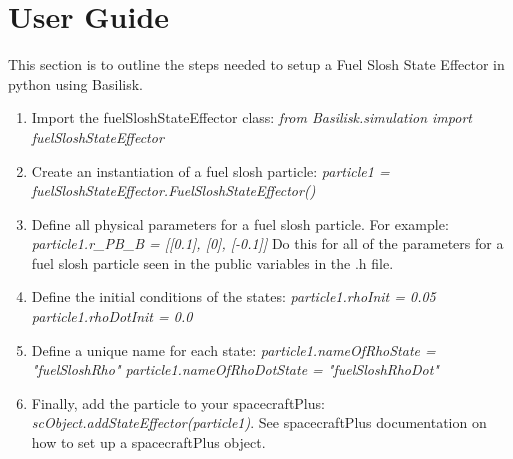 \section{User Guide}

This section is to outline the steps needed to setup a Fuel Slosh State Effector in python using Basilisk.

\begin{enumerate}
	\item Import the fuelSloshStateEffector class: \newline \textit{from Basilisk.simulation import fuelSloshStateEffector}
	\item Create an instantiation of a fuel slosh particle: \newline \textit{particle1 = fuelSloshStateEffector.FuelSloshStateEffector()}
	\item Define all physical parameters for a fuel slosh particle. For example: \newline
	\textit{particle1.r\_PB\_B = [[0.1], [0], [-0.1]]}
	Do this for all of the parameters for a fuel slosh particle seen in the public variables in the .h file.
	\item Define the initial conditions of the states:\newline
	\textit{particle1.rhoInit = 0.05 \quad particle1.rhoDotInit = 0.0}
	\item Define a unique name for each state:\newline
	\textit{particle1.nameOfRhoState = "fuelSloshRho" \quad particle1.nameOfRhoDotState = "fuelSloshRhoDot"}
	\item Finally, add the particle to your spacecraftPlus:\newline
	\textit{scObject.addStateEffector(particle1)}. See spacecraftPlus documentation on how to set up a spacecraftPlus object. 
\end{enumerate}
